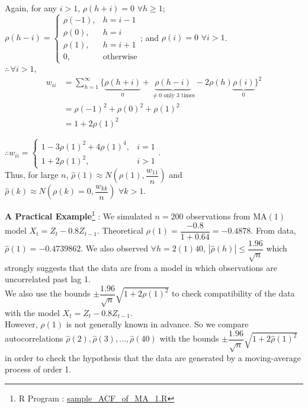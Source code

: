\documentclass[11pt, a4paper]{article}
\numberwithin{equation}{section}
\theoremstyle{definition}
\begin{document}
Again, for any $i > 1$, $\rho(h + i) = 0 \,\, \forall h \geq 1$; $\rho(h - i) = \begin{cases} \rho(-1), &h = i-1 \\ \rho(0), &h = i \\ \rho(1), &h = i+1 \\ 0, &\text{otherwise} \end{cases}$; and $\rho(i) = 0 \,\, \forall i > 1$. \\[0.25em]

$\therefore \, \forall i > 1$, 
\begin{align*}
w_{ii} &= \sum \limits_{h = 1}^{\infty} \{\underbrace{\rho(h+i)}_{0} + \underbrace{\rho(h-i)}_{\neq 0 \text{ only 3 times}} - 2\rho(h)\underbrace{\rho(i)}_{0}\}^2 \\[0.25em]
&= \rho(-1)^2 + \rho(0)^2 + \rho(1)^2 \\[0.25em]
&= 1 + 2\rho(1)^2
\end{align*}

$\therefore w_{ii} = \begin{cases}1 - 3\rho(1)^2 + 4\rho(1)^4, &i = 1 \\ 1 + 2\rho(1)^2, &i > 1 \end{cases}$. \\[0.5em]

Thus, for large $n$, $\hat{\rho}(1) \approx N\left( \rho(1), \dfrac{w_{11}}{n}\right)$ and $\hat{\rho}(k) \approx N\left( \rho(k) = 0, \dfrac{w_{kk}}{n}\right)\,\, \forall k > 1$.

\newpage

\fcLittleMouse[scale = 0.4, draw = brown, line width = 1.5] \textbf{A Practical Example}\footnote{R Program : \href{https://raw.githubusercontent.com/sakunisgithub/Time_Series_Analysis/refs/heads/master/R_Programs/sample_ACF_of_MA_1.R}{sample\_ACF\_of\_MA\_1.R}} : We simulated $n = 200$ observations from MA$(1)$ model $X_t = Z_t - 0.8 Z_{t-1}$. Theoretical $\rho(1) = \dfrac{-0.8}{1 + 0.64} = -0.4878$. From data, $\hat{\rho}(1) = -0.4739862$. We also observed $\forall h = 2(1)40$, $|\hat{\rho}(h)| \leq \dfrac{1.96}{\sqrt{n}}$ which strongly suggests that the data are from a model in which observations are uncorrelated past lag 1. \\[0.25em]

We also use the bounds $\pm \dfrac{1.96}{\sqrt{n}}\sqrt{1 + 2\rho(1)^2}$ to check compatibility of the data with the model $X_t = Z_t - 0.8 Z_{t-1}$. \\[0.25em]

However, $\rho(1)$ is not generally known in advance. So we compare autocorrelations $\hat{\rho}(2), \hat{\rho}(3), \ldots, \hat{\rho}(40)$ with the bounds $\pm \dfrac{1.96}{\sqrt{n}}\sqrt{1 + 2\hat{\rho}(1)^2}$ in order to check the hypothesis that the data are generated by a moving-average process of order 1. \\[0.25em]
\end{document}
